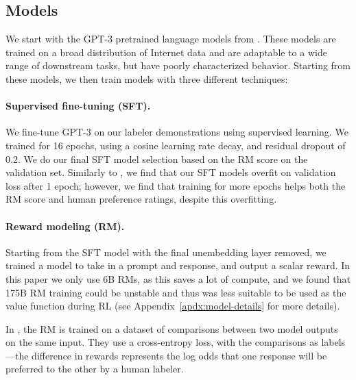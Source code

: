 \documentclass{article}
\begin{document}
\subsection{Models}
\label{sec:models}

We start with the GPT-3 pretrained language models from \citet{brown2020language}. These models are trained on a broad distribution of Internet data and are adaptable to a wide range of downstream tasks, but have poorly characterized behavior. Starting from these models, we then train models with three different techniques:

\paragraph{Supervised fine-tuning (SFT).} We fine-tune GPT-3 on our labeler demonstrations using supervised learning.  We trained for 16 epochs, using a cosine learning rate decay, and residual dropout of 0.2. We do our final SFT model selection based on the RM score on the validation set. Similarly to \citet{wu2021recursively}, we find that our SFT models overfit on validation loss after 1 epoch; however, we find that training for more epochs helps both the RM score and human preference ratings, despite this overfitting.

\paragraph{Reward modeling (RM).} Starting from the SFT model with the final unembedding layer
removed, we trained a model to take in a prompt and response, and output
a scalar reward. In this paper we only use 6B RMs, as this saves a lot of compute, and we found that 175B RM training could be unstable and thus was less suitable to be used as the value function during RL (see Appendix~\ref{apdx:model-details} for more details). 

In \citet{stiennon2020learning}, the RM is trained on a dataset of comparisons between two model outputs on the same input. They use a cross-entropy loss, with the comparisons as labels---the difference in rewards represents the log odds that one response will be preferred to the other by a human labeler.  
\end{document}
